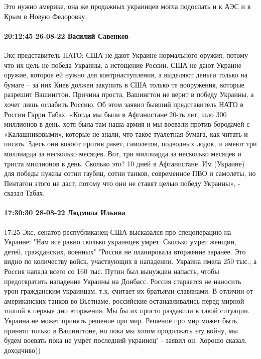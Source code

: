 Это нужно америке, она же продажных украинцев могла подослать и к АЭС и в Крым
в Новую Федоровку.


\paragraph{20:12:45 26-08-22 Василий Савенков}

Экс-представитель НАТО: США не дают Украине нормального оружия, потому что их цель не победа Украины, а истощение России.
США не дают Украине оружие, которое ей нужно для контрнаступления, а выделяют деньги только на бумаге – за них Киев должен закупить в США только те вооружения, которые разрешит Вашингтон. Причина проста, Вашингтон не верит в победу Украины, а хочет лишь ослабить Россию.
Об этом заявил бывший представитель НАТО в России Гарри Табах.
«Когда мы были в Афганистане 20-ть лет, шло 300 миллионов в день, хотя была там наша армия и мы воевали против бородачей с «Калашниковыми», которые не знали, что такое туалетная бумага, как читать и писать. Здесь они воюют против ракет, самолетов, подводных лодок, и имеют три миллиарда за несколько месяцев. Вот, три миллиарда за несколько месяцев и триста миллионов в день. Сколько это? 10 дней в Афганистане. Им (Украине) для победы нужны сотни гаубиц, сотни танков, современное ПВО и самолеты, но Пентагон этого не даст, потому что они не ставят целью победу Украины», - сказал Табах.


\paragraph{17:30:30 28-08-22 Людмила Ильина}
17:25
Экс. сенатор-республиканец США высказался про спецоперацию на Украине:
"Нам все равно сколько украинцев умрет. Сколько умрет женщин, детей, гражданских, военных"
"Россия не планировала вторжение заранее. Это видно по количеству войск, участвующих в нападении. Украина имела 250 тыс., а Россия напала всего со 160 тыс.
Путин был вынужден напасть, чтобы предотвратить нападение Украины на Донбасс.
Россия старается не наносить урон гражданским украинцам, т.к. считает их братьями-славянами.
В отличии от американских танков во Вьетнаме, российские останавливались перед мирной толпой в первые дни вторжения. Мы бы их просто раздавили в такой ситуации.
Украина не может принять решение про мир. Решение про мир может быть принято только в Вашингтоне, но пока мы хотим продолжать эту войну, мы будем воевать пока не умрет последний украинец" - заявил он.
Хорошо сказал, доходчиво))

